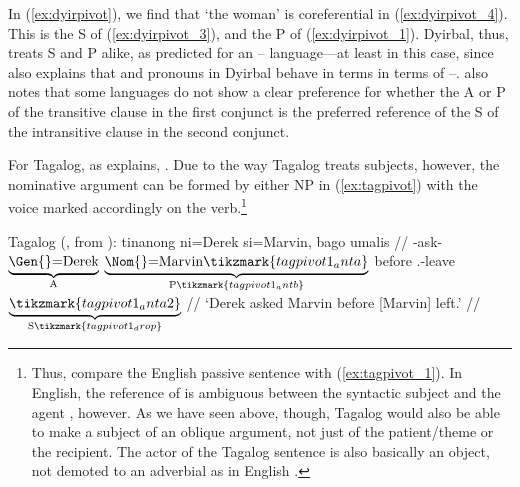 \xe

In (\ref{ex:dyirpivot}), we find that  `the woman' is
coreferential in (\ref{ex:dyirpivot_4}). This is the S of
(\ref{ex:dyirpivot_3}), and the P of (\ref{ex:dyirpivot_1}). Dyirbal, thus,
treats S and P alike, as predicted for an \Abs{}--\Erg{} language---at least in
this case, since \citet[113]{comrie1989} also explains that \Fsg{} and \Ssg{}
pronouns in Dyirbal behave in terms in terms of \Nom{}--\Acc{}.
\citet{comrie1989} also notes that some languages do not show a clear
preference for whether the A or P of the transitive clause in the first
conjunct is the preferred reference of the S of the intransitive clause in the
second conjunct.

For Tagalog, as \citet{kroeger1991} explains, . Due to the way
Tagalog treats subjects, however, the nominative argument can be formed by
either NP in (\ref{ex:tagpivot}) with the voice marked accordingly on the
verb.\footnote{Thus, compare the English passive sentence  with (\ref{ex:tagpivot_1}). In English,
the reference of  is ambiguous between the syntactic subject 
and the agent , however. As we have seen above, though, Tagalog would
also be able to make a subject of an oblique argument, not just of the
patient/theme or the recipient. The actor of the Tagalog sentence is also
basically an object, not demoted to an adverbial as in English
\citep[38--44]{kroeger1991}.}

\pex\label{ex:tagpivot}%
Tagalog (\cite[adapted from][31]{kroeger1991}, from 
	\cite[151--152]{ramoscena1990}):
\a\label{ex:tagpivot_1}%
	\begingl[aboveglbskip=1.5em, aboveglftskip=1.75em]
		\gla tinanong ni=Derek si=Marvin, bago umalis {} //
		\glb \Pfv{}-ask-\Ov{}
			$\underbrace{\text{\Gen{}=Derek}}_{\text{A}}$
			$\underbrace{\text{\Nom{}=Marvin}\tikzmark{tagpivot1_anta}}_%
				{\text{P}\tikzmark{tagpivot1_antb}}$
			before \Pfv{}.\Av{}-leave
			$\underbrace{ \tikzmark{tagpivot1_anta2}}_%
				{\text{S}\tikzmark{tagpivot1_drop}}$
			//
		\glft `Derek asked Marvin before [Marvin] left.' //
	\endgl

